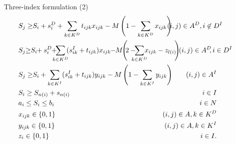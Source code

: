 \documentclass[9pt,xcolor={dvipsnames}]{beamer}
\begin{document}
\begin{frame}[shrink=20]{Three-index formulation (2)}
\begin{align}
\label{c30} & S_j \geq \hspace{-1mm} S_i +  s_i^D + \sum_{k \in K^{D}} t_{ijk} x_{ijk} - M\left(1-\sum_{k \in K^{D}} x_{ijk}\right) & \hspace{-15mm}  (i,j) \in A^D, i \not\in D^I \hspace{7mm} \\
\label{c31} & S_j \hspace{-1mm} \geq \hspace{-1mm} S_i \hspace{-1mm}+ s^D_i \hspace{-1mm}+ \hspace{-3mm}\sum_{k \in K^{D}}\hspace{-1mm}(s_{ik}^I + t_{ijk} )x_{ijk} \hspace{-1mm}- \hspace{-1mm}M\hspace{-1mm}\left(\hspace{-1mm}2-\hspace{-3mm}\sum_{k \in K^{D}} \hspace{-2mm}x_{ijk}-z_{l(i)}\hspace{-1mm}\right)  &  \hspace{-4mm}   (i,j) \in A^D\hspace{-1mm}, i \in D^I \hspace{2mm}  \\
\label{c32} & S_j \geq \hspace{-1mm} S_i +  \sum_{k \in K^{I}}(s_{ik}^I + t_{ijk} )y_{ijk} - M\left(1-\sum_{k \in K^{I}} y_{ijk}\right)  & \hspace{-40mm}  (i,j) \in A^I \hspace{10mm} \\
\label{c33} & S_i \geq S_{n(i)} + s_{n(i)} & \hspace{-40mm}   i \in I \hspace{10mm}  \\
\label{c34}  & a_i \leq S_i \leq b_{i} & \hspace{-40mm}  i \in N \hspace{10mm} \\
\label{c36} & x_{ijk} \in \{0,1\} & \hspace{-50mm}  (i,j) \in A , k \in K^D  \hspace{10mm} \\
\label{c37} & y_{ijk} \in \{0,1\} & \hspace{-50mm} (i,j) \in A , k \in K^I  \hspace{10mm} \\
\label{c38} & z_{i} \in \{0,1\} & \hspace{-40mm}  i \in I. \hspace{10mm} 
\end{align}
\end{frame}
\fi
\end{document}
